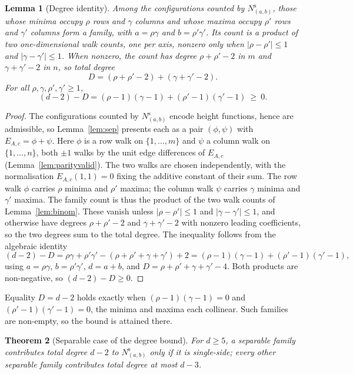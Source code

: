 \documentclass[11pt]{article}
\newtheorem{theorem}{Theorem}[section]
\newtheorem{lemma}[theorem]{Lemma}
\theoremstyle{definition}
\theoremstyle{remark}
\begin{document}
\begin{lemma}[Degree identity]\label{lem:dimid}
Among the configurations counted by $N^{\mathrm{s}}_{(a,b)}$, those whose minima occupy $\rho$ rows
and $\gamma$ columns and whose maxima occupy $\rho'$ rows and $\gamma'$ columns
form a family, with $a=\rho\gamma$ and $b=\rho'\gamma'$. Its count is a product of
two one-dimensional walk counts, one per axis, nonzero only when $|\rho-\rho'|\le1$
and $|\gamma-\gamma'|\le1$. When nonzero, the count has degree $\rho+\rho'-2$ in
$m$ and $\gamma+\gamma'-2$ in $n$, so total degree
\[
  D=(\rho+\rho'-2)+(\gamma+\gamma'-2).
\]
For all $\rho,\gamma,\rho',\gamma'\ge1$,
\[
  (d-2)-D=(\rho-1)(\gamma-1)+(\rho'-1)(\gamma'-1)\ \ge\ 0.
\]
\end{lemma}

\begin{proof}
The configurations counted by $N^{\mathrm{s}}_{(a,b)}$ encode height functions, hence are
admissible, so Lemma~\ref{lem:sep} presents each
as a pair $(\phi,\psi)$ with $E_{A,c}=\phi+\psi$. Here $\phi$ is a row walk on
$\{1,\dots,m\}$ and $\psi$ a column walk on $\{1,\dots,n\}$, both $\pm1$ walks by
the unit edge differences of $E_{A,c}$ (Lemma~\ref{lem:parityvalid}). The two
walks are chosen independently, with the normalisation $E_{A,c}(1,1)=0$ fixing the
additive constant of their sum. The row walk $\phi$ carries $\rho$ minima and
$\rho'$ maxima; the column walk $\psi$ carries $\gamma$ minima and $\gamma'$ maxima.
The family count is thus the product of the two walk counts of Lemma~\ref{lem:binom}.
These vanish unless $|\rho-\rho'|\le1$ and $|\gamma-\gamma'|\le1$, and otherwise have
degrees $\rho+\rho'-2$ and $\gamma+\gamma'-2$ with nonzero leading coefficients, so the
two degrees sum to the total degree. The inequality follows from the algebraic identity
\[
  (d-2)-D=\rho\gamma+\rho'\gamma'-(\rho+\rho'+\gamma+\gamma')+2
    =(\rho-1)(\gamma-1)+(\rho'-1)(\gamma'-1),
\]
using $a=\rho\gamma$, $b=\rho'\gamma'$, $d=a+b$, and
$D=\rho+\rho'+\gamma+\gamma'-4$. Both products are non-negative, so $(d-2)-D\ge0$.
\end{proof}

Equality $D=d-2$ holds exactly when $(\rho-1)(\gamma-1)=0$ and
$(\rho'-1)(\gamma'-1)=0$, the minima and maxima each collinear. Such families
are non-empty, so the bound is attained there.

\begin{theorem}[Separable case of the degree bound]\label{thm:sepcase}
For $d\ge5$, a separable family contributes total degree $d-2$ to
$N^{\mathrm{s}}_{(a,b)}$ only if it is single-side; every other separable family
contributes total degree at most $d-3$.
\end{theorem}
\end{document}
